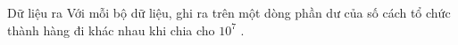 Dữ liệu ra
Với mỗi bộ dữ liệu, ghi ra trên một dòng phần dư của số cách tổ chức thành hàng đi khác nhau khi chia cho $10^{7}$ .